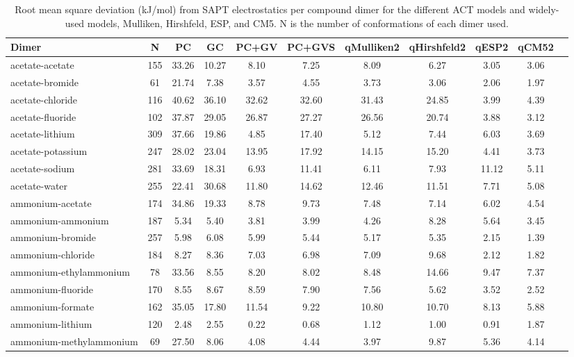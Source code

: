 \begin{longtable}{lcccccccccc}
\caption{Root mean square deviation (kJ/mol) from SAPT electrostatics per compound dimer for the different ACT models and widely-used models, Mulliken, Hirshfeld, ESP, and CM5. N is the number of conformations of each dimer used.}\\
\hline
Dimer & N  & PC & GC & PC+GV & PC+GVS & qMulliken2 & qHirshfeld2 & qESP2 & qCM52\\
\hline
acetate-acetate & 155  & 33.26 & 10.27 & 8.10 & 7.25 & 8.09 & 6.27 & 3.05 & 3.06\\
acetate-bromide & 61  & 21.74 & 7.38 & 3.57 & 4.55 & 3.73 & 3.06 & 2.06 & 1.97\\
acetate-chloride & 116  & 40.62 & 36.10 & 32.62 & 32.60 & 31.43 & 24.85 & 3.99 & 4.39\\
acetate-fluoride & 102  & 37.87 & 29.05 & 26.87 & 27.27 & 26.56 & 20.74 & 3.88 & 3.12\\
acetate-lithium & 309  & 37.66 & 19.86 & 4.85 & 17.40 & 5.12 & 7.44 & 6.03 & 3.69\\
acetate-potassium & 247  & 28.02 & 23.04 & 13.95 & 17.92 & 14.15 & 15.20 & 4.41 & 3.73\\
acetate-sodium & 281  & 33.69 & 18.31 & 6.93 & 11.41 & 6.11 & 7.93 & 11.12 & 5.11\\
acetate-water & 255  & 22.41 & 30.68 & 11.80 & 14.62 & 12.46 & 11.51 & 7.71 & 5.08\\
ammonium-acetate & 174  & 34.86 & 19.33 & 8.78 & 9.73 & 7.48 & 7.14 & 6.02 & 4.54\\
ammonium-ammonium & 187  & 5.34 & 5.40 & 3.81 & 3.99 & 4.26 & 8.28 & 5.64 & 3.45\\
ammonium-bromide & 257  & 5.98 & 6.08 & 5.99 & 5.44 & 5.17 & 5.35 & 2.15 & 1.39\\
ammonium-chloride & 184  & 8.27 & 8.36 & 7.03 & 6.98 & 7.09 & 9.68 & 2.12 & 1.82\\
ammonium-ethylammonium & 78  & 33.56 & 8.55 & 8.20 & 8.02 & 8.48 & 14.66 & 9.47 & 7.37\\
ammonium-fluoride & 170  & 8.55 & 8.67 & 8.59 & 7.90 & 7.56 & 5.62 & 3.52 & 2.52\\
ammonium-formate & 162  & 35.05 & 17.80 & 11.54 & 9.22 & 10.80 & 10.70 & 8.13 & 5.88\\
ammonium-lithium & 120  & 2.48 & 2.55 & 0.22 & 0.68 & 1.12 & 1.00 & 0.91 & 1.87\\
ammonium-methylammonium & 69  & 27.50 & 8.06 & 4.08 & 4.44 & 3.97 & 9.87 & 5.36 & 4.14\\

\end{longtable}
